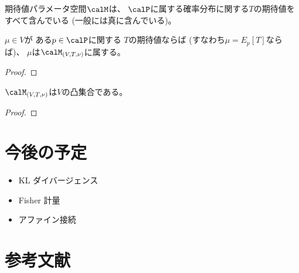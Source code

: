 \documentclass[report]{jlreq}
\begin{document}
期待値パラメータ空間$\calM$は、
$\calP$に属する確率分布に関する$T$の期待値をすべて含んでいる
(一般には真に含んでいる)。

\begin{proposition}
    $\mu \in V$が
    ある$p \in \calP$に関する
    $T$の期待値ならば (すなわち$\mu = E_p[T]$ならば)、
    $\mu$は$\calM_{(V, T, \nu)}$に属する。
\end{proposition}

\begin{proof}
    \TODO{}
\end{proof}

\begin{proposition}
    $\calM_{(V, T, \nu)}$は$V$の凸集合である。
\end{proposition}

\begin{proof}
    \TODO{}
\end{proof}


%
\section{今後の予定}

\begin{itemize}
    \item KL ダイバージェンス
    \item Fisher 計量
    \item アファイン接続
\end{itemize}

%
\section{参考文献}

\nocite{amari_information_2016}

{
    \renewcommand{\bibsection}{}
    
    
}
\end{document}
